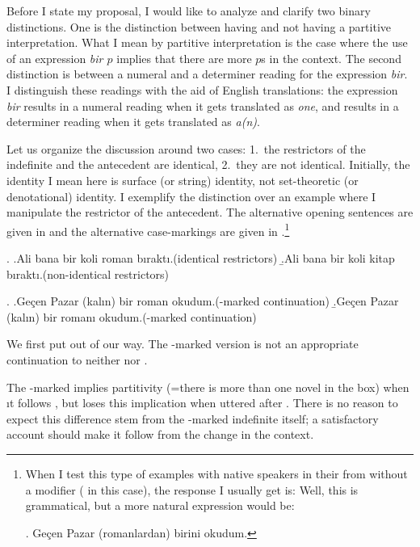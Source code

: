 \documentclass[11pt,a4paper]{article}
\begin{document}
Before I state my proposal, I would like to analyze and clarify two
binary distinctions. One is the distinction between having and not
having a partitive interpretation. What I mean by partitive
interpretation is the case where the use of an expression \emph{bir
$p$} implies that there are more $p$s in the context. The second
distinction is between a numeral and a determiner reading for the
expression \emph{bir}. I distinguish these readings with the aid of
English translations: the expression \emph{bir} results in a numeral
reading when it gets translated as \emph{one}, and results in a
determiner reading when it gets translated  as \emph{a(n)}. 

Let us organize the discussion around two cases: 1.\ the restrictors
of the indefinite and the antecedent are identical, 2.\ they are not
identical. Initially, the identity I mean here is surface (or string)
identity, not set-theoretic (or denotational) identity. I exemplify
the distinction over an example where I manipulate the restrictor of
the antecedent.  The alternative opening sentences are given in
 and the alternative case-markings are given in
.\footnote{When I test this type of examples with
		native speakers in their from without a modifier
		( in this case), the response I usually get
		is: Well, this is grammatical, but a more natural expression
		would be:
		
\ex. Geçen Pazar (romanlardan) birini okudum.

}

\ex.\label{exromanintro}
\a.\label{exromanirom}Ali bana bir koli roman bıraktı.\hfill{(identical restrictors)}
\b.\label{exromanikit}Ali bana bir koli kitap bıraktı.\hfill{(non-identical restrictors)}

\ex.\label{exromancont}
\a.\label{exromanz}Geçen Pazar (kalın) bir roman okudum.\hfill{(\zero-marked continuation)}
\b.\label{exromana}Geçen Pazar (kalın) bir romanı
okudum.\hfill{(\acc-marked continuation)}


We first put  out of our way. The \zero-marked version
is not an appropriate continuation to neither  nor
.

The \acc-marked  implies partitivity (=there is more
than one novel in the box) when ıt follows , but
loses this implication when uttered after . There is
no reason to expect this difference stem from the \acc-marked
indefinite itself; a satisfactory account should make it follow from
the change in the context.
\end{document}
